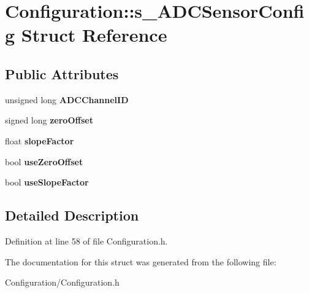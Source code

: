 \section{Configuration\+:\+:s\+\_\+\+A\+D\+C\+Sensor\+Config Struct Reference}
\label{struct_configuration_1_1s___a_d_c_sensor_config}
\subsection*{Public Attributes}
\begin{DoxyCompactItemize}
\item 
unsigned long {\bfseries A\+D\+C\+Channel\+I\+D}\label{struct_configuration_1_1s___a_d_c_sensor_config_af33a65507d28ca40631aec98890576af}

\item 
signed long {\bfseries zero\+Offset}\label{struct_configuration_1_1s___a_d_c_sensor_config_a499c971640e7c3ffbb5c663cd09b6a23}

\item 
float {\bfseries slope\+Factor}\label{struct_configuration_1_1s___a_d_c_sensor_config_aa838340dc4d53eee0490837371f8e628}

\item 
bool {\bfseries use\+Zero\+Offset}\label{struct_configuration_1_1s___a_d_c_sensor_config_a8d20d3d0722c5e86947a5d2c4b56e515}

\item 
bool {\bfseries use\+Slope\+Factor}\label{struct_configuration_1_1s___a_d_c_sensor_config_a87f4a84004dcd3ce478fc4aa6783bdae}

\end{DoxyCompactItemize}


\subsection{Detailed Description}


Definition at line 58 of file Configuration.\+h.



The documentation for this struct was generated from the following file\+:\begin{DoxyCompactItemize}
\item 
Configuration/Configuration.\+h\end{DoxyCompactItemize}
